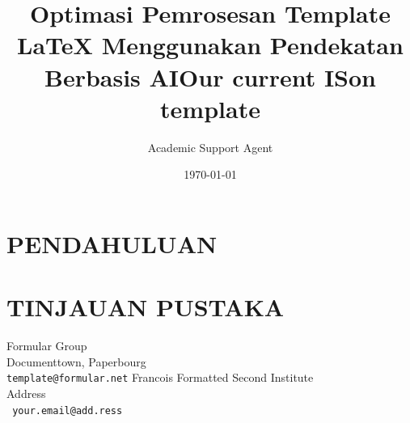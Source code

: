 \documentclass{article}
\title{Optimasi Pemrosesan Template LaTeX Menggunakan Pendekatan Berbasis AI}
\author{Academic Support Agent}
\date{\today}
\begin{document}
\maketitle

\begin{abstract}

\end{abstract}

\chapter{PENDAHULUAN}


\chapter{TINJAUAN PUSTAKA}


\usepackage{ison2022,amssymb,amsmath,epsfig}
\setcounter{page}{1}
\ninept
\graphicspath{{pics/}}

\title{Our current ISon template}

%
	{Formular Group \\ Documenttown, Paperbourg\\ {\tt template@formular.net}} {Francois Formatted}
{Second Institute \\ Address \\ {\tt
your.email@add.ress}}
\end{document}
